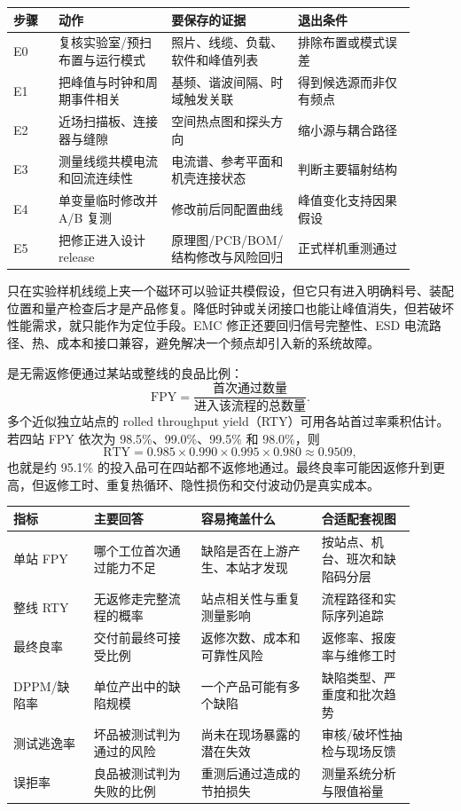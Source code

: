 \begin{longtable}{L{0.10\linewidth}L{0.25\linewidth}L{0.29\linewidth}L{0.26\linewidth}}
\toprule
步骤 & 动作 & 要保存的证据 & 退出条件 \\
\midrule
E0 & 复核实验室/预扫布置与运行模式 & 照片、线缆、负载、软件和峰值列表 & 排除布置或模式误差 \\\tablerowrule
E1 & 把峰值与时钟和周期事件相关 & 基频、谐波间隔、时域触发关联 & 得到候选源而非仅有频点 \\\tablerowrule
E2 & 近场扫描板、连接器与缝隙 & 空间热点图和探头方向 & 缩小源与耦合路径 \\\tablerowrule
E3 & 测量线缆共模电流和回流连续性 & 电流谱、参考平面和机壳连接状态 & 判断主要辐射结构 \\\tablerowrule
E4 & 单变量临时修改并 A/B 复测 & 修改前后同配置曲线 & 峰值变化支持因果假设 \\\tablerowrule
E5 & 把修正进入设计 release & 原理图/PCB/BOM/结构修改与风险回归 & 正式样机重测通过 \\
\bottomrule
\end{longtable}

只在实验样机线缆上夹一个磁环可以验证共模假设，但它只有进入明确料号、装配位置和量产检查后才是产品修复。降低时钟或关闭接口也能让峰值消失，但若破坏性能需求，就只能作为定位手段。EMC 修正还要回归信号完整性、ESD 电流路径、热、成本和接口兼容，避免解决一个频点却引入新的系统故障。


 是无需返修便通过某站或整线的良品比例：
\[
  \mathrm{FPY}=\frac{\text{首次通过数量}}{\text{进入该流程的总数量}}.
\]
多个近似独立站点的 rolled throughput yield（RTY）可用各站首过率乘积估计。若四站 FPY 依次为 98.5\%、99.0\%、99.5\% 和 98.0\%，则
\[
  \mathrm{RTY}=0.985\times0.990\times0.995\times0.980
  \approx 0.9509,
\]
也就是约 95.1\% 的投入品可在四站都不返修地通过。最终良率可能因返修升到更高，但返修工时、重复热循环、隐性损伤和交付波动仍是真实成本。

\begin{longtable}{L{0.18\linewidth}L{0.24\linewidth}L{0.27\linewidth}L{0.21\linewidth}}
\toprule
指标 & 主要回答 & 容易掩盖什么 & 合适配套视图 \\
\midrule
单站 FPY & 哪个工位首次通过能力不足 & 缺陷是否在上游产生、本站才发现 & 按站点、机台、班次和缺陷码分层 \\\tablerowrule
整线 RTY & 无返修走完整流程的概率 & 站点相关性与重复测量影响 & 流程路径和实际序列追踪 \\\tablerowrule
最终良率 & 交付前最终可接受比例 & 返修次数、成本和可靠性风险 & 返修率、报废率与维修工时 \\\tablerowrule
DPPM/缺陷率 & 单位产出中的缺陷规模 & 一个产品可能有多个缺陷 & 缺陷类型、严重度和批次趋势 \\\tablerowrule
测试逃逸率 & 坏品被测试判为通过的风险 & 尚未在现场暴露的潜在失效 & 审核/破坏性抽检与现场反馈 \\\tablerowrule
误拒率 & 良品被测试判为失败的比例 & 重测后通过造成的节拍损失 & 测量系统分析与限值裕量 \\
\bottomrule
\end{longtable}

